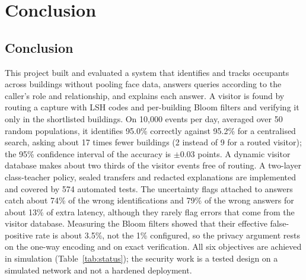 \documentclass[12pt,a4paper,oneside]{report}
\begin{document}
\clearpage
\chapter{Conclusion}
\section{Conclusion}
This project built and evaluated a system that identifies and tracks occupants across buildings without pooling face data, answers queries according to the caller's role and relationship, and explains each answer. A visitor is found by routing a capture with LSH codes and per-building Bloom filters and verifying it only in the shortlisted buildings. On 10,000 events per day, averaged over 50 random populations, it identifies 95.0\% correctly against 95.2\% for a centralised search, asking about 17 times fewer buildings (2 instead of 9 for a routed visitor); the 95\% confidence interval of the accuracy is $\pm0.03$ points. A dynamic visitor database makes about two thirds of the visitor events free of routing. A two-layer class-teacher policy, sealed transfers and redacted explanations are implemented and covered by 574 automated tests. The uncertainty flags attached to answers catch about 74\% of the wrong identifications and 79\% of the wrong answers for about 13\% of extra latency, although they rarely flag errors that come from the visitor database. Measuring the Bloom filters showed that their effective false-positive rate is about 3.5\%, not the 1\% configured, so the privacy argument rests on the one-way encoding and on exact verification. All six objectives are achieved in simulation (Table~\ref{tab:status}); the security work is a tested design on a simulated network and not a hardened deployment.
\end{document}
